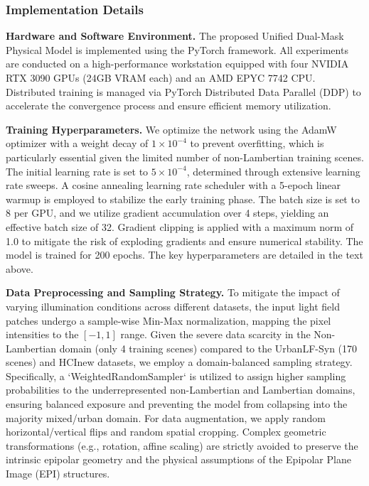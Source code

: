 \subsubsection{Implementation Details}

\textbf{Hardware and Software Environment.} 
The proposed Unified Dual-Mask Physical Model is implemented using the PyTorch framework. All experiments are conducted on a high-performance workstation equipped with four NVIDIA RTX 3090 GPUs (24GB VRAM each) and an AMD EPYC 7742 CPU. Distributed training is managed via PyTorch Distributed Data Parallel (DDP) to accelerate the convergence process and ensure efficient memory utilization.

\textbf{Training Hyperparameters.} 
We optimize the network using the AdamW optimizer with a weight decay of $1 \times 10^{-4}$ to prevent overfitting, which is particularly essential given the limited number of non-Lambertian training scenes. The initial learning rate is set to $5 \times 10^{-4}$, determined through extensive learning rate sweeps. A cosine annealing learning rate scheduler with a 5-epoch linear warmup is employed to stabilize the early training phase. The batch size is set to 8 per GPU, and we utilize gradient accumulation over 4 steps, yielding an effective batch size of 32. Gradient clipping is applied with a maximum norm of 1.0 to mitigate the risk of exploding gradients and ensure numerical stability. The model is trained for 200 epochs. The key hyperparameters are detailed in the text above.

\textbf{Data Preprocessing and Sampling Strategy.} 
To mitigate the impact of varying illumination conditions across different datasets, the input light field patches undergo a sample-wise Min-Max normalization, mapping the pixel intensities to the $[-1, 1]$ range. Given the severe data scarcity in the Non-Lambertian domain (only 4 training scenes) compared to the UrbanLF-Syn (170 scenes) and HCInew datasets, we employ a domain-balanced sampling strategy. Specifically, a `WeightedRandomSampler` is utilized to assign higher sampling probabilities to the underrepresented non-Lambertian and Lambertian domains, ensuring balanced exposure and preventing the model from collapsing into the majority mixed/urban domain. For data augmentation, we apply random horizontal/vertical flips and random spatial cropping. Complex geometric transformations (e.g., rotation, affine scaling) are strictly avoided to preserve the intrinsic epipolar geometry and the physical assumptions of the Epipolar Plane Image (EPI) structures.

